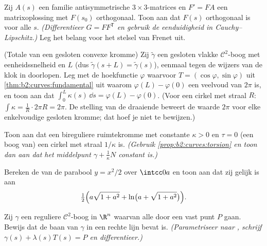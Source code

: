 \begin{exercise}[$\star\star\star$]\label{exo:b2:curves:7}
Zij $A(s)$ een  familie antisymmetrische $3 \times
3$-matrices en $F' = F A$ een matrixoplossing met $F(s_0)$
orthogonaal. Toon aan dat $F(s)$ orthogonaal is voor alle $s$.
\emph{(Differentieer $G = F F^{\mathsf T}$ en gebruik de
eenduidigheid in Cauchy--Lipschitz.)} Leg het belang voor het
stelsel van Frenet uit.
\end{exercise}

\begin{exercise}[$\star\star\star$]\label{exo:b2:curves:8}
(Totale  van een gesloten convexe kromme) Zij
$\tilde\gamma$ een gesloten vlakke $\mathcal{C}^2$-boog met
eenheidssnelheid en  $L$ (dus $\tilde\gamma(s + L) =
\tilde\gamma(s)$), eenmaal tegen de wijzers van de klok in
doorlopen. Leg met de hoekfunctie $\varphi$ waarvoor $T =
(\cos\varphi, \sin\varphi)$ uit \cref{thm:b2:curves:fundamental}
uit waarom $\varphi(L) - \varphi(0)$ een veelvoud van $2\pi$ is, en
toon aan dat $\int_0^L \kappa(s)\,\dd s = \varphi(L) -
\varphi(0)$. (Voor een cirkel met straal $R$: $\int \kappa =
\frac1R \cdot 2\pi R = 2\pi$. De stelling van de draaiende
 beweert de waarde $2\pi$ voor elke enkelvoudige gesloten
kromme; dat hoef je niet te bewijzen.)
\end{exercise}

\begin{exercise}[$\star\star\star$]\label{exo:b2:curves:9}
Toon aan dat een bireguliere ruimtekromme met constante $\kappa >
0$ en $\tau = 0$ (een boog van) een cirkel met straal $1/\kappa$
is. \emph{(Gebruik \cref{prop:b2:curves:torsion} en toon dan aan
dat het middelpunt $\gamma + \frac1\kappa N$ constant is.)}
\end{exercise}

\begin{exercise}[$\star$]\label{exo:b2:curves:10}
Bereken de  van de parabool $y = x^2/2$ over $\intcc0a$
en toon aan dat zij gelijk is aan
\[
\tfrac12\Bigl(a\sqrt{1 + a^2} + \ln\bigl(a + \sqrt{1 +
a^2}\bigr)\Bigr).
\]
\end{exercise}

\begin{exercise}[$\star\star$]\label{exo:b2:curves:11}
Zij $\gamma$ een reguliere $\mathcal C^2$-boog in $\R^n$ waarvan
alle  door een vast punt $P$ gaan. Bewijs dat de baan van
$\gamma$ in een rechte lijn bevat is. \emph{(Parametriseer naar
, schrijf $\gamma(s) + \lambda(s)T(s) = P$ en
differentieer.)}
\end{exercise}

